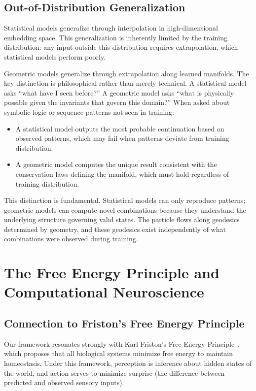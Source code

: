 \documentclass[12pt,a4paper]{article}
\begin{document}
\subsection{Out-of-Distribution Generalization}
\label{sec:ood-generalization}

Statistical models generalize through interpolation in high-dimensional embedding space. This generalization is inherently limited by the training distribution: any input outside this distribution requires extrapolation, which statistical models perform poorly.

Geometric models generalize through extrapolation along learned manifolds. The key distinction is philosophical rather than merely technical. A statistical model asks ``what have I seen before?'' A geometric model asks ``what is physically possible given the invariants that govern this domain?'' When asked about symbolic logic or sequence patterns not seen in training:

\begin{itemize}
    \item A statistical model outputs the most probable continuation based on observed patterns, which may fail when patterns deviate from training distribution.

    \item A geometric model computes the unique result consistent with the conservation laws defining the manifold, which must hold regardless of training distribution.
\end{itemize}

This distinction is fundamental. Statistical models can only reproduce patterns; geometric models can compute novel combinations because they understand the underlying structure governing valid states. The particle flows along geodesics determined by geometry, and these geodesics exist independently of what combinations were observed during training.

\section{The Free Energy Principle and Computational Neuroscience}
\label{sec:free-energy}

\subsection{Connection to Friston's Free Energy Principle}
\label{sec:fep-connection}

Our framework resonates strongly with Karl Friston's Free Energy Principle~\cite{friston2010}, which proposes that all biological systems minimize free energy to maintain homeostasis. Under this framework, perception is inference about hidden states of the world, and action serves to minimize surprise (the difference between predicted and observed sensory inputs).
\end{document}
